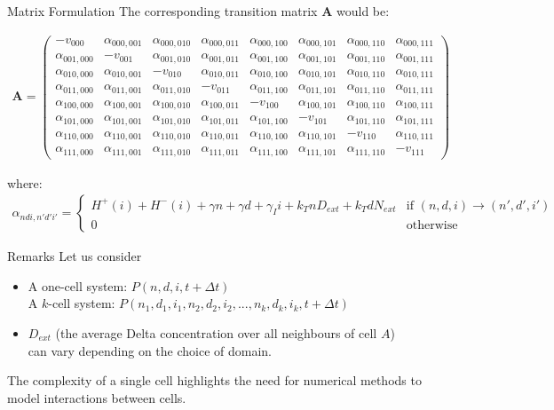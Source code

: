 \documentclass[aspectratio=169]{beamer}
\begin{document}
\begin{frame}{Matrix Formulation}
The corresponding transition matrix $\mathbf{A}$ would be:

\small \begin{align*}
\mathbf{A} = 
\begin{pmatrix}
-v_{000} & \alpha_{000,001} & \alpha_{000,010} & \alpha_{000,011} & \alpha_{000,100} & \alpha_{000,101} & \alpha_{000,110} & \alpha_{000,111} \\
\alpha_{001,000} & -v_{001} & \alpha_{001,010} & \alpha_{001,011} & \alpha_{001,100} & \alpha_{001,101} & \alpha_{001,110} & \alpha_{001,111} \\
\alpha_{010,000} & \alpha_{010,001} & -v_{010} & \alpha_{010,011} & \alpha_{010,100} & \alpha_{010,101} & \alpha_{010,110} & \alpha_{010,111} \\
\alpha_{011,000} & \alpha_{011,001} & \alpha_{011,010} & -v_{011} & \alpha_{011,100} & \alpha_{011,101} & \alpha_{011,110} & \alpha_{011,111} \\
\alpha_{100,000} & \alpha_{100,001} & \alpha_{100,010} & \alpha_{100,011} & -v_{100} & \alpha_{100,101} & \alpha_{100,110} & \alpha_{100,111} \\
\alpha_{101,000} & \alpha_{101,001} & \alpha_{101,010} & \alpha_{101,011} & \alpha_{101,100} & -v_{101} & \alpha_{101,110} & \alpha_{101,111} \\
\alpha_{110,000} & \alpha_{110,001} & \alpha_{110,010} & \alpha_{110,011} & \alpha_{110,100} & \alpha_{110,101} & -v_{110} & \alpha_{110,111} \\
\alpha_{111,000} & \alpha_{111,001} & \alpha_{111,010} & \alpha_{111,011} & \alpha_{111,100} & \alpha_{111,101} & \alpha_{111,110} & -v_{111}
\end{pmatrix}
\end{align*}

where:
\begin{align*}
\alpha_{ndi,n'd'i'} = 
\begin{cases}
H^+(i) + H^-(i) + \gamma n + \gamma d + \gamma_I i + k_T n D_{ext} + k_T d N_{ext} & \text{if } (n,d,i) \rightarrow (n',d',i') \\
0 & \text{otherwise}
\end{cases}
\end{align*}

\end{frame}

\begin{frame}{Remarks}
Let us consider

\begin{itemize}
    \item A one-cell system: $P(n,d,i,t+\Delta t)$ \\
    A $k$-cell system: $P(n_1,d_1,i_1,n_2,d_2,i_2,...,n_k,d_k,i_k,t+\Delta t)$\\
    \item $D_{ext}$ (the average Delta concentration over all neighbours of cell $A$)\\ can vary depending on the choice of domain.
\end{itemize}
\vfill
\pause
The complexity of a single cell highlights the need for numerical methods to model interactions between cells.
\end{frame}
\end{document}
